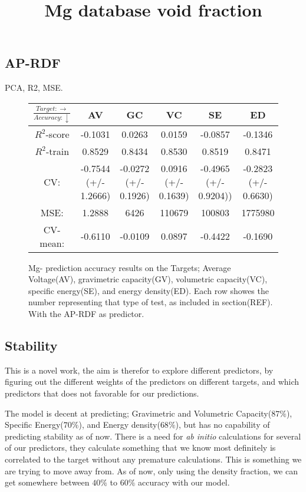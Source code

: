 \subsection{AP-RDF}
PCA, R2, MSE.


\begin{figure}[H]
\scriptsize
\title{Mg database void fraction}
\begin{tabular}{|c|c|c|c|c|c|}
	\hline 
	$\frac{Target: \rightarrow}{Accuracy:\downarrow} $ & AV & GC & VC & SE & ED 
	 \\ 
	\hline
	$R^2$-score & -0.1031 & 0.0263 & 0.0159 & -0.0857 & -0.1346\\ 
	\hline 
	$R^2$-train & 0.8529 & 0.8434 & 0.8530 & 0.8519 & 0.8471 \\ 
	\hline 
	CV: & -0.7544 (+/- 1.2666) & -0.0272 (+/- 0.1926) & 0.0916 (+/- 0.1639) & -0.4965 (+/- 0.9204)) & -0.2823 (+/- 0.6630) \\ 
	\hline
	MSE: & 1.2888 & 6426& 110679 & 100803 & 1775980 \\ 
	\hline
	CV-mean: &-0.6110 & -0.0109 & 0.0897  & -0.4422 & -0.1690 \\
	\hline
\end{tabular}
\label{tab:mg-n}
\caption{Mg- prediction accuracy results on the Targets; Average Voltage(AV), gravimetric capacity(GV), volumetric capacity(VC), specific energy(SE), and energy density(ED). Each row showes the number representing that type of test, as included in section(REF). With the AP-RDF as predictor. }
\end{figure}

\subsection{Stability}







This is a novel work, the aim is therefor to explore different predictors, by figuring out the different weights of the predictors on different targets, and which predictors that does not favorable for our predictions. 

The model is decent at predicting; Gravimetric and Volumetric Capacity($87\%$), Specific Energy($70\%$), and Energy density($68\%$), but has no capability of predicting stability as of now. There is a need for \textit{ab initio} calculations for several of our predictors, they calculate something that we know most definitely is correlated to the target without any premature calculations. This is something we are trying to move away from. As of now, only using the density fraction, we can get somewhere between $40 \%$ to $60 \%$ accuracy with our model. 

